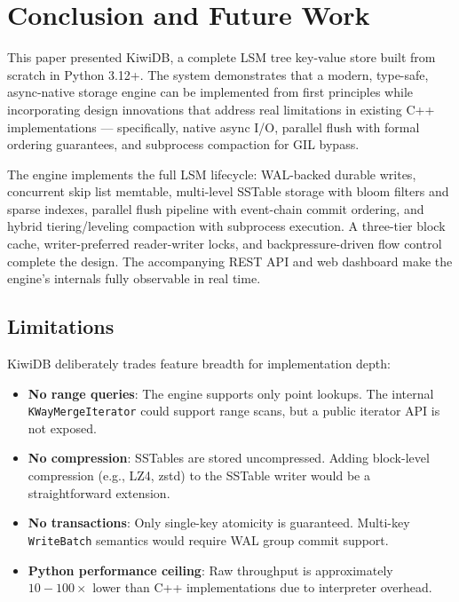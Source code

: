 \documentclass[conference]{IEEEtran}
\begin{document}
\section{Conclusion and Future Work}
\label{sec:conclusion}

This paper presented KiwiDB, a complete LSM tree key-value store built from scratch in Python 3.12+. The system demonstrates that a modern, type-safe, async-native storage engine can be implemented from first principles while incorporating design innovations that address real limitations in existing C++ implementations --- specifically, native async I/O, parallel flush with formal ordering guarantees, and subprocess compaction for GIL bypass.

The engine implements the full LSM lifecycle: WAL-backed durable writes, concurrent skip list memtable, multi-level SSTable storage with bloom filters and sparse indexes, parallel flush pipeline with event-chain commit ordering, and hybrid tiering/leveling compaction with subprocess execution. A three-tier block cache, writer-preferred reader-writer locks, and backpressure-driven flow control complete the design. The accompanying REST API and web dashboard make the engine's internals fully observable in real time.

\subsection{Limitations}

KiwiDB deliberately trades feature breadth for implementation depth:

\begin{itemize}[leftmargin=*]
    \item \textbf{No range queries}: The engine supports only point lookups. The internal \texttt{KWayMergeIterator} could support range scans, but a public iterator API is not exposed.
    \item \textbf{No compression}: SSTables are stored uncompressed. Adding block-level compression (e.g., LZ4, zstd) to the SSTable writer would be a straightforward extension.
    \item \textbf{No transactions}: Only single-key atomicity is guaranteed. Multi-key \texttt{WriteBatch} semantics would require WAL group commit support.
    \item \textbf{Python performance ceiling}: Raw throughput is approximately $10{-}100\times$ lower than C++ implementations due to interpreter overhead.
\end{itemize}
\end{document}
